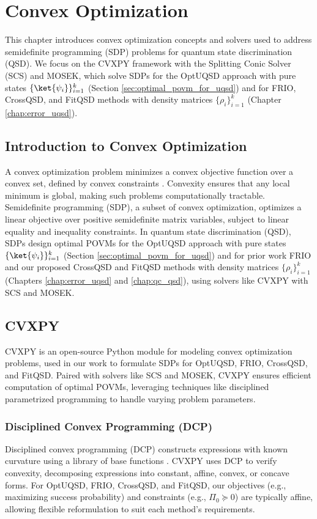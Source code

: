 
\chapter{Convex Optimization}
\label{chap:basics_co}

This chapter introduces convex optimization concepts and solvers used to
address semidefinite programming (SDP) problems for quantum state discrimination (QSD).
We focus on the CVXPY framework with the Splitting Conic Solver (SCS) and MOSEK,
which solve SDPs for the OptUQSD approach with pure states
\(\{ \ket{\psi_i} \}_{i=1}^k\) (Section \ref{sec:optimal_povm_for_uqsd}) and
for FRIO, CrossQSD, and FitQSD methods with density matrices
\(\{ \rho_i \}_{i=1}^k\) (Chapter \ref{chap:error_uqsd}).

\section{Introduction to Convex Optimization}
A convex optimization problem minimizes a convex objective function over a
convex set, defined by convex constraints \cite{RN33}.
Convexity ensures that any local minimum is global, making such problems
computationally tractable.
Semidefinite programming (SDP), a subset of convex optimization, optimizes a
linear objective over positive semidefinite matrix variables, subject to
linear equality and inequality constraints.
In quantum state discrimination (QSD), SDPs design optimal POVMs for the
OptUQSD approach with pure states \(\{ \ket{\psi_i} \}_{i=1}^k\)
(Section \ref{sec:optimal_povm_for_uqsd}) and for prior work FRIO and our
proposed CrossQSD and FitQSD methods with density matrices
\(\{ \rho_i \}_{i=1}^k\) (Chapters \ref{chap:error_uqsd} and
\ref{chap:qc_qsd}), using solvers like CVXPY with SCS and MOSEK.

\section{CVXPY}
CVXPY \cite{RN473} is an open-source Python module for modeling convex
optimization problems, used in our work to formulate SDPs for OptUQSD, FRIO, CrossQSD, and FitQSD.
Paired with solvers like SCS and MOSEK, CVXPY ensures efficient computation of
optimal POVMs, leveraging techniques like disciplined parametrized programming
to handle varying problem parameters.

\subsection{Disciplined Convex Programming (DCP)}
Disciplined convex programming (DCP) constructs expressions with known
curvature using a library of base functions \cite{RN476}.
CVXPY uses DCP to verify convexity, decomposing expressions into constant,
affine, convex, or concave forms.
For OptUQSD, FRIO, CrossQSD, and FitQSD, our objectives
(e.g., maximizing success probability) and constraints (e.g., \(\Pi_0 \succeq 0\))
are typically affine, allowing flexible reformulation to suit each method’s requirements.

